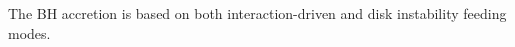 \documentclass[twocolumn]{aastex631}
\newcommand{\todo}[1]{\textcolor{red}{[{\bf TODO}: #1]}}
\begin{document}
The BH accretion is based on both interaction-driven and disk instability feeding modes.
\end{document}
